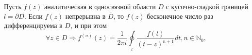 
\begin{col-answer-preambule}
\end{col-answer-preambule}

\begin{theorem}
  Пусть $f(z)$ аналитическая в односвязной области $D$ с кусочно-гладкой границей $l = \partial D$.
  Если $f(z)$ непрерывна в $\overline{D}$, то $f(z)$ бесконечное число раз дифференцируема в $D$, и
  при этом
  \begin{equation}
    \label{eq:lecture32-05}
    \forall z \in D \Rightarrow f^{(n)}(z) = \dfrac{1}{2\pi i}\oint\limits_l
    \dfrac{f(t)}{(t - z)^{n + 1}}dt, n \in \mathbb{N}_0,
  \end{equation}
\end{theorem}
